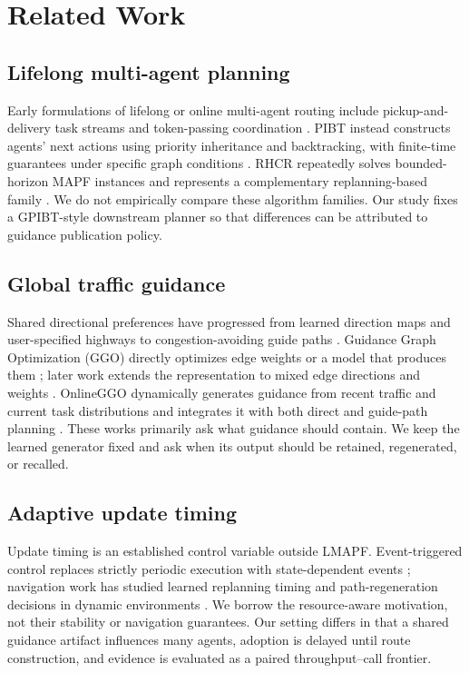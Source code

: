 \documentclass[sigconf,review,anonymous]{acmart}
\begin{document}
\section{Related Work}

\subsection{Lifelong multi-agent planning}

Early formulations of lifelong or online multi-agent routing include
pickup-and-delivery task streams and token-passing coordination
\cite{ma2017lifelong}. PIBT instead constructs agents' next actions using
priority inheritance and backtracking, with finite-time guarantees under
specific graph conditions \cite{ijcai2019p76}. RHCR repeatedly solves
bounded-horizon MAPF instances and represents a complementary replanning-based
family \cite{li2021rhcr}. We do not empirically compare these algorithm
families. Our study fixes a GPIBT-style downstream planner so that differences
can be attributed to guidance publication policy.

\subsection{Global traffic guidance}

Shared directional preferences have progressed from learned direction maps
and user-specified highways \cite{jansen2008direction,cohen2015highways} to
congestion-avoiding guide paths \cite{chen2024traffic}. Guidance Graph
Optimization (GGO) directly optimizes edge weights or a model that produces
them \cite{ijcai2024p0035}; later work extends the representation to mixed edge
directions and weights \cite{zhang2026mixed}. OnlineGGO dynamically generates
guidance from recent traffic and current task distributions and integrates it
with both direct and guide-path planning \cite{zang2025online}. These works
primarily ask what guidance should contain. We keep the learned generator
fixed and ask when its output should be retained, regenerated, or recalled.

\subsection{Adaptive update timing}

Update timing is an established control variable outside LMAPF. Event-triggered
control replaces strictly periodic execution with state-dependent events
\cite{tabuada2007event}; navigation work has studied learned replanning timing
and path-regeneration decisions in dynamic environments
\cite{honda2024when,han2018path}. We borrow the resource-aware motivation, not
their stability or navigation guarantees. Our setting differs in that a shared
guidance artifact influences many agents, adoption is delayed until route
construction, and evidence is evaluated as a paired throughput--call frontier.
\end{document}
